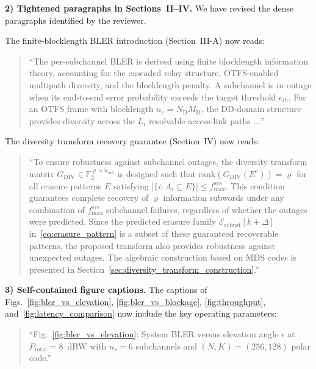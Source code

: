 \textbf{2) Tightened paragraphs in Sections~II--IV.}
We have revised the dense paragraphs identified by the reviewer.

The finite-blocklength BLER introduction (Section~III-A) now reads:

\begin{quote}
``{\color{blue}The per-subchannel BLER is derived using finite blocklength information theory, accounting for the cascaded relay structure, OTFS-enabled multipath diversity, and the blocklength penalty. A subchannel is in outage when its end-to-end error probability exceeds the target threshold $\epsilon_{\mathrm{th}}$. For an OTFS frame with blocklength $n_c = N_{\mathrm{D}} M_{\mathrm{D}}$, the DD-domain structure provides diversity across the $L_i$ resolvable access-link paths $\ldots$}''
\end{quote}

The diversity transform recovery guarantee (Section~IV) now reads:

\begin{quote}
``{\color{blue}To ensure robustness against subchannel outages, the diversity transform matrix $G_{\mathrm{DIV}} \in \mathbb{F}_2^{\varrho \times n_{\text{out}}}$ is designed such that $\mathrm{rank}\!\left(G_{\mathrm{DIV}}(E^{c})\right)=\varrho$ for all erasure patterns $E$
satisfying $|\{i : A_i \subseteq E\}| \leq f_{\mathrm{max}}^{\mathrm{sys}}$. This condition guarantees
complete recovery of $\varrho$ information subwords under any combination of $f_{\mathrm{max}}^{\mathrm{sys}}$ subchannel failures, regardless of whether the outages were predicted. Since the predicted erasure family $\mathcal{E}_{\mathrm{robust}}[k+\Delta]$ in~\eqref{eq:erasure_pattern} is a subset of these guaranteed recoverable patterns, the proposed transform also provides robustness against unexpected outages. The algebraic construction based on MDS codes is presented in Section~\ref{sec:diversity_transform_construction}.}''
\end{quote}

\textbf{3) Self-contained figure captions.}
The captions of Figs.~\ref{fig:bler_vs_elevation}, \ref{fig:bler_vs_blockage}, \ref{fig:throughput}, and~\ref{fig:latency_comparison} now include the key operating parameters:

\begin{quote}
``{\color{blue}Fig.~\ref{fig:bler_vs_elevation}: System BLER versus elevation angle $\epsilon$ at $P_{\mathrm{total}} = 8$~dBW with $n_{\mathrm{s}} = 6$ subchannels and $(N,K) = (256,128)$ polar code.}''
\end{quote}

